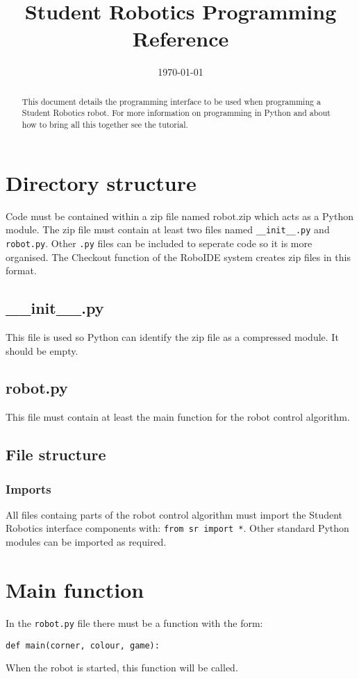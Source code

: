 \documentclass{article}
\begin{document}
\title{Student Robotics Programming Reference}
\date{\today}
\maketitle
\begin{abstract}
This document details the programming interface to be used when programming a
Student Robotics robot.  For more information on programming in Python and
about how to bring all this together see the tutorial.
\end{abstract}
\section{Directory structure}
Code must be contained within a zip file named robot.zip which acts as a Python
module.  The zip file must contain at least two files named
\texttt{\_\_init\_\_.py} and \texttt{robot.py}.  Other \texttt{.py} files can be
included to seperate code so it is more organised.  The Checkout function of
the RoboIDE system creates zip files in this format.
\subsection{\_\_init\_\_.py}
This file is used so Python can identify the zip file as a compressed module.
It should be empty.
\subsection{robot.py}
This file must contain at least the main function for the robot control
algorithm.
\subsection{File structure}
\subsubsection{Imports}
All files containg parts of the robot control algorithm must import the Student
Robotics interface components with: \texttt{from sr import *}.  Other standard
Python modules can be imported as required.
\section{Main function}
In the \texttt{robot.py} file there must be a function with the form:

\texttt{def main(corner, colour, game):}

When the robot is started, this function will be called.
\end{document}
